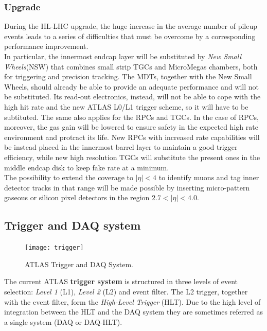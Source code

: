 \documentclass[a4paper,twoside,12pt]{article}
\begin{document}
\subsubsection{Upgrade}\cite{scoping}
During the HL-LHC upgrade, the huge increase in the average number of pileup events leads to a series of difficulties that must be overcome by a corresponding performance improvement.\\

In particular, the innermost endcap layer will be substituted by \textit{New Small Wheels}(NSW) that combines small strip TGCs and MicroMegas chambers, both for triggering and 
precision tracking. The MDTs, together with the New Small Wheels, should already be able to provide an adequate performance and will not be substituted. Its read-out electronics, instead, will not 
be able to cope with the high hit rate and the new ATLAS L0/L1 trigger scheme, so it will have to be subtituted. The same also applies for the RPCs and TGCs. In the case of RPCs, moreover,
the gas gain will be lowered to ensure safety in the expected high rate environment and protract its life. New RPCs with increased rate capabilities will be instead placed in the innermost barrel layer to maintain a
good trigger efficiency, while new high resolution TGCs will substitute the present ones in the middle endcap disk to keep fake rate at a minimum.\\

The possibility to extend the coverage to $|\eta| < 4$ to identify muons and tag inner detector tracks in that range will be made possible by inserting micro-pattern gaseous or silicon pixel
detectors in the region $2.7 < |\eta| < 4.0$.

\subsection{Trigger and DAQ system}

\begin{figure} [h]
	\centering
	\texttt{[image: trigger]}
	\caption{ATLAS Trigger and DAQ System\cite{Green:2010zza}.}
	\label{fig:trigger}
\end{figure}

The current ATLAS \textbf{trigger system} is structured in three levels of event selection: \textit{Level 1} (L1), \textit{Level 2} (L2) and event filter\cite{Aad:2008zzm}. The L2 trigger, together
with the event filter, form the \textit{High-Level Trigger} (HLT). Due to the high level of integration between the HLT and the DAQ system they are sometimes referred as a single system (DAQ or 
DAQ-HLT)\cite{Green:2010zza}.\\
\end{document}

